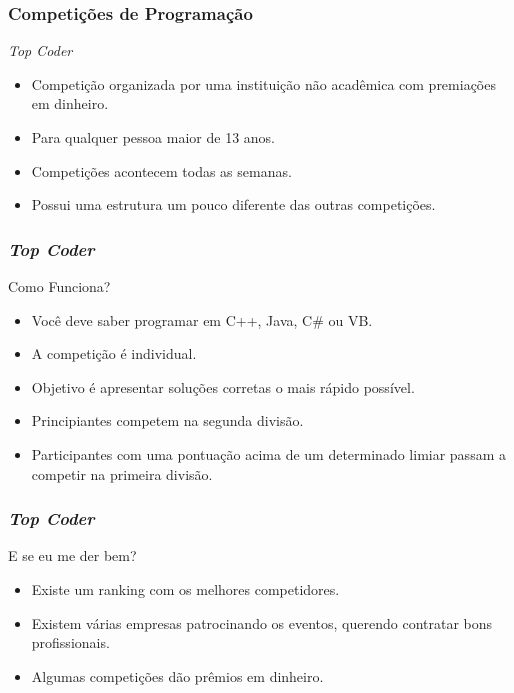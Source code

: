 \begin{frame}
 \frametitle{Competições de Programação}
 \begin{block}{\em Top Coder}
  \begin{itemize}
   \item Competição organizada por uma instituição não acadêmica com premiações em dinheiro.
   \item Para qualquer pessoa maior de 13 anos.
   \item Competições acontecem todas as semanas.
   \item Possui uma estrutura um pouco diferente das outras competições.
  \end{itemize}
 \end{block}
\end{frame}
\begin{frame}
 \frametitle{\em Top Coder}
 \begin{block}{Como Funciona?}
  \begin{itemize}
   \item Você deve saber programar em C++, Java, C\# ou VB.
   \item A competição é individual.
   \item Objetivo é apresentar soluções corretas o mais rápido possível.
   \item Principiantes competem na segunda divisão.
   \item Participantes com uma pontuação acima de um determinado limiar passam a competir na primeira divisão.
  \end{itemize}
 \end{block}
\end{frame}
\begin{frame}
 \frametitle{\em Top Coder}
 \begin{block}{E se eu me der bem?}
  \begin{itemize}
   \item Existe um ranking com os melhores competidores.
   \item Existem várias empresas patrocinando os eventos, querendo contratar bons profissionais.
   \item Algumas competições dão prêmios em dinheiro.
  \end{itemize}
 \end{block}
\end{frame}
